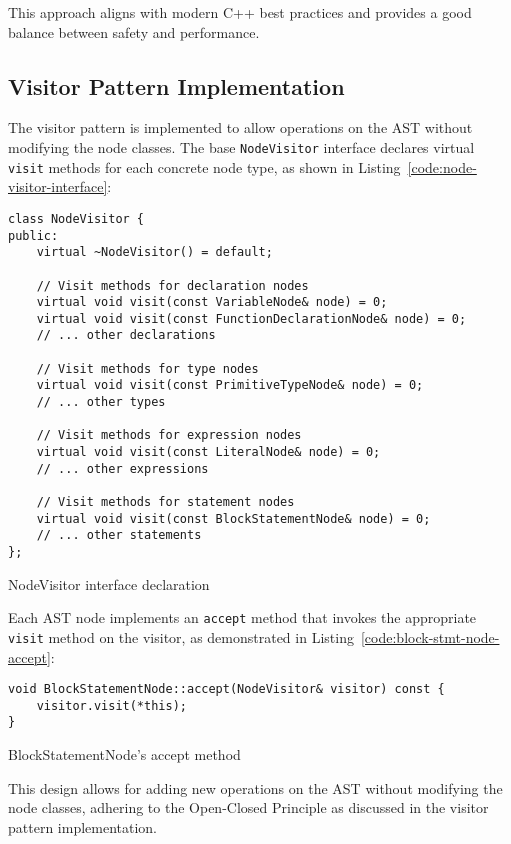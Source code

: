This approach aligns with modern C++ best practices and provides a good balance between safety and performance.

\subsection{Visitor Pattern Implementation}

The visitor pattern is implemented to allow operations on the AST without modifying the node classes. The base \texttt{NodeVisitor} interface declares virtual \texttt{visit} methods for each concrete node type, as shown in Listing~\ref{code:node-visitor-interface}:

\begin{listing}[ht!]
\begin{verbatim}
class NodeVisitor {
public:
    virtual ~NodeVisitor() = default;
    
    // Visit methods for declaration nodes
    virtual void visit(const VariableNode& node) = 0;
    virtual void visit(const FunctionDeclarationNode& node) = 0;
    // ... other declarations
    
    // Visit methods for type nodes
    virtual void visit(const PrimitiveTypeNode& node) = 0;
    // ... other types
    
    // Visit methods for expression nodes
    virtual void visit(const LiteralNode& node) = 0;
    // ... other expressions
    
    // Visit methods for statement nodes
    virtual void visit(const BlockStatementNode& node) = 0;
    // ... other statements
};
\end{verbatim}
\caption{NodeVisitor interface declaration}
\label{code:node-visitor-interface}
\end{listing}

Each AST node implements an \texttt{accept} method that invokes the appropriate \texttt{visit} method on the visitor, as demonstrated in Listing~\ref{code:block-stmt-node-accept}:

\begin{listing}[ht!]
\begin{verbatim}
void BlockStatementNode::accept(NodeVisitor& visitor) const {
    visitor.visit(*this);
}
\end{verbatim}
\caption{BlockStatementNode's accept method}
\label{code:block-stmt-node-accept}
\end{listing}

This design allows for adding new operations on the AST without modifying the node classes, adhering to the Open-Closed Principle as discussed in the visitor pattern implementation.


